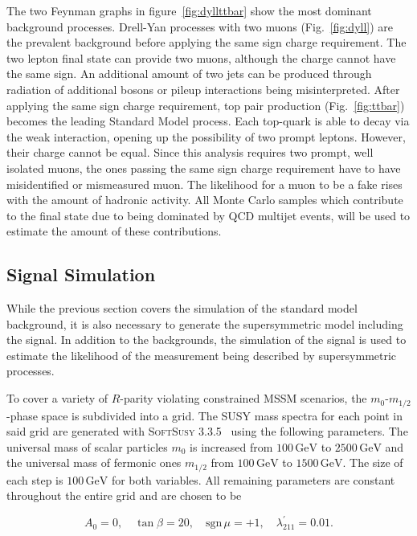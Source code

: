 The two Feynman graphs in figure~\ref{fig:dyllttbar} show the most dominant background processes. Drell-Yan processes with two muons (Fig.~\ref{fig:dyll}) are the prevalent background before applying the same sign charge requirement. The two lepton final state can provide two muons, although the charge cannot have the same sign. An additional amount of two jets can be produced through radiation of additional bosons or pileup interactions being misinterpreted. After applying the same sign charge requirement, top pair production (Fig.~\ref{fig:ttbar}) becomes the leading Standard Model process. Each top-quark is able to decay via the weak interaction, opening up the possibility of two prompt leptons. However, their charge cannot be equal. Since this analysis requires two prompt, well isolated muons, the ones passing the same sign charge requirement have to have misidentified or mismeasured muon. The likelihood for a muon to be a fake rises with the amount of hadronic activity. All Monte Carlo samples which contribute to the final state due to being dominated by QCD multijet events, will be used to estimate the amount of these contributions.


\subsection{Signal Simulation}
\label{sec:signal-sim}

While the previous section covers the simulation of the standard model background, it is also necessary to generate the supersymmetric model including the signal. In addition to the backgrounds, the simulation of the signal is used to estimate the likelihood of the measurement being described by supersymmetric processes.

To cover a variety of $R$-parity violating constrained MSSM scenarios, the $m_0$-$m_{1/2}$-phase space is subdivided into a grid. The SUSY mass spectra for each point in said grid are generated with \textsc{SoftSusy 3.3.5}~\cite{softsusy,sonnegueth} using the following parameters. The universal mass of scalar particles $m_0$ is increased from $100\,\text{GeV}$ to $2500\,\text{GeV}$ and the universal mass of fermonic ones $m_{1/2}$ from $100\,\text{GeV}$ to $1500\,\text{GeV}$. The size of each step is $100\,\text{GeV}$ for both variables. All remaining parameters are constant throughout the entire grid and are chosen to be

\begin{equation}
  \label{eq:gen-mssm-parameters}
  A_0 = 0, \quad \tan{\beta} = 20, \quad \text{sgn}\,\mu = +1, \quad \lambda^\prime_{211} = 0.01.
\end{equation}

